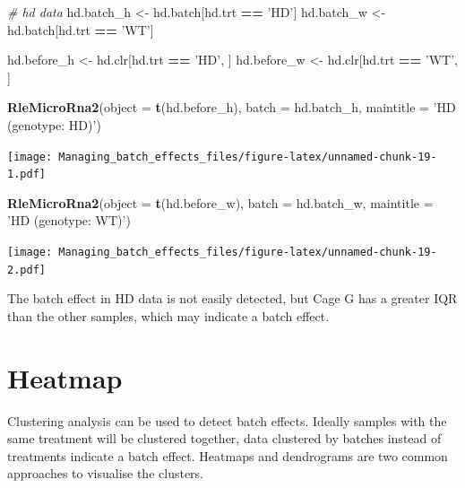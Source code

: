 \documentclass[]{book}
\newenvironment{Shaded}{\begin{snugshade}}{\end{snugshade}}
\newcommand{\KeywordTok}[1]{\textcolor[rgb]{0.13,0.29,0.53}{\textbf{#1}}}
\newcommand{\DataTypeTok}[1]{\textcolor[rgb]{0.13,0.29,0.53}{#1}}
\newcommand{\StringTok}[1]{\textcolor[rgb]{0.31,0.60,0.02}{#1}}
\newcommand{\CommentTok}[1]{\textcolor[rgb]{0.56,0.35,0.01}{\textit{#1}}}
\newcommand{\OperatorTok}[1]{\textcolor[rgb]{0.81,0.36,0.00}{\textbf{#1}}}
\newcommand{\NormalTok}[1]{#1}
\begin{document}
\begin{Shaded}
\begin{Highlighting}[]
\CommentTok{# hd data}
\NormalTok{hd.batch_h <-}\StringTok{ }\NormalTok{hd.batch[hd.trt }\OperatorTok{==}\StringTok{ 'HD'}\NormalTok{]}
\NormalTok{hd.batch_w <-}\StringTok{ }\NormalTok{hd.batch[hd.trt }\OperatorTok{==}\StringTok{ 'WT'}\NormalTok{] }

\NormalTok{hd.before_h <-}\StringTok{ }\NormalTok{hd.clr[hd.trt }\OperatorTok{==}\StringTok{ 'HD'}\NormalTok{, ]}
\NormalTok{hd.before_w <-}\StringTok{ }\NormalTok{hd.clr[hd.trt }\OperatorTok{==}\StringTok{ 'WT'}\NormalTok{, ]}

\KeywordTok{RleMicroRna2}\NormalTok{(}\DataTypeTok{object =} \KeywordTok{t}\NormalTok{(hd.before_h), }\DataTypeTok{batch =}\NormalTok{ hd.batch_h, }
             \DataTypeTok{maintitle =} \StringTok{'HD (genotype: HD)'}\NormalTok{)}
\end{Highlighting}
\end{Shaded}

\texttt{[image: Managing\_batch\_effects\_files/figure-latex/unnamed-chunk-19-1.pdf]}

\begin{Shaded}
\begin{Highlighting}[]
\KeywordTok{RleMicroRna2}\NormalTok{(}\DataTypeTok{object =} \KeywordTok{t}\NormalTok{(hd.before_w), }\DataTypeTok{batch =}\NormalTok{ hd.batch_w, }
             \DataTypeTok{maintitle =} \StringTok{'HD (genotype: WT)'}\NormalTok{)}
\end{Highlighting}
\end{Shaded}

\texttt{[image: Managing\_batch\_effects\_files/figure-latex/unnamed-chunk-19-2.pdf]}

The batch effect in HD data is not easily detected, but Cage G has a
greater IQR than the other samples, which may indicate a batch effect.

\section{Heatmap}\label{heatmap}

Clustering analysis can be used to detect batch effects. Ideally samples
with the same treatment will be clustered together, data clustered by
batches instead of treatments indicate a batch effect. Heatmaps and
dendrograms are two common approaches to visualise the clusters.
\end{document}
